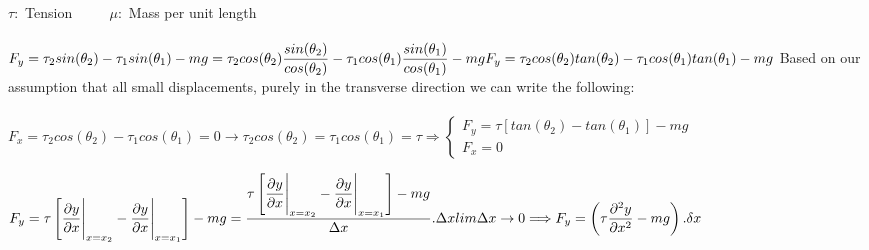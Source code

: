 \documentclass[fleqn]{article}
\begin{document}
\begin{enumerate}
\begin{enumerate}
        \textcolor{hwColor}{
          $\tau :$ Tension ~~~~ $\mu:$ Mass per unit length \\
          \\
          $
            F_y=\tau_2 sin(\theta_2)-\tau_1 sin(\theta_1)-mg=\tau_2 cos(\theta_2) \dfrac{sin(\theta_2)}{cos(\theta_2)}-\tau_1 cos(\theta_1) \dfrac{sin(\theta_1)}{cos(\theta_1)}-mg \\
            \\
            F_y=\tau_2 cos(\theta_2) tan(\theta_2)-\tau_1 cos(\theta_1) tan(\theta_1)-mg \\
            \\
          $
          Based on our assumption that all small displacements, purely in the transverse direction we can write the following: \\
          \\
          $
            F_x=\tau_2 cos(\theta_2)-\tau_1 cos(\theta_1)=0 \rightarrow \tau_2 cos(\theta_2)=\tau_1 cos(\theta_1)=\tau \Rightarrow \begin{cases}
              F_y= \tau \left[tan(\theta_2)-tan(\theta_1)\right]-mg  \\
              F_x=0
            \end{cases}
          $
        }

        \textcolor{hwColor}{
          $
            F_y= \tau \left[\dfrac{\partial y}{\partial x}\Biggr|_{x=x_2}^{}-\dfrac{\partial y}{\partial x}\Biggr|_{x=x_1}^{}\right]-mg \\
            \\
            =\dfrac{\tau \left[\dfrac{\partial y}{\partial x}\Biggr|_{x=x_2}^{}-\dfrac{\partial y}{\partial x}\Biggr|_{x=x_1}^{}\right]-mg}{\Delta x}. \Delta x \\
            \\
            lim \Delta x \rightarrow 0 \Longrightarrow F_y=\left(\tau \dfrac{\partial^2 y}{\partial x^2}-mg\right).\delta x
          $
        }


\end{enumerate}
\end{enumerate}
\end{document}
